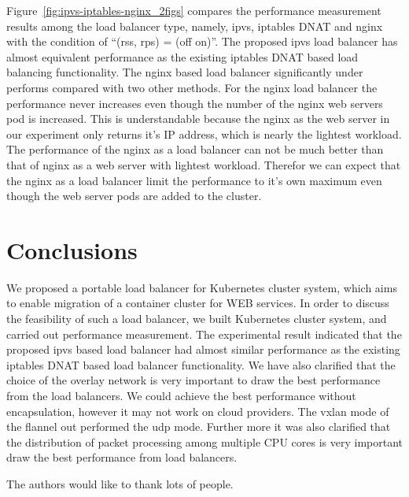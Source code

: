 Figure~\ref{fig:ipvs-iptables-nginx_2figs} compares the performance measurement results 
among the load balancer type, namely, ipvs, iptables DNAT and nginx 
with the condition of \enquote{(rss, rps) = (off on)}.
The proposed ipvs load balancer has almost equivalent performance as the existing iptables 
DNAT based load balancing functionality. 
The nginx based load balancer significantly under performs compared with two other methods.
For the nginx load balancer the performance never increases even though the number of the 
nginx web servers pod is increased.
This is understandable because the nginx as the web server in our experiment only 
returns it's IP address, which is nearly the lightest workload.
The performance of the nginx as a load balancer can not be much better than that of nginx as a web server 
with lightest workload.
Therefor we can expect that the nginx as a load balancer limit the performance to it's own maximum 
even though the web server pods are added to the cluster.

\section{Conclusions}\label{Conclusions}

We proposed a portable load balancer for Kubernetes cluster system, 
which aims to enable migration of a container cluster for WEB services.
In order to discuss the feasibility of such a load balancer, we built 
Kubernetes cluster system, and carried out performance measurement.
The experimental result indicated that the proposed ipvs based load balancer
had almost similar performance as the existing iptables DNAT based load balancer functionality.
We have also clarified that the choice of the overlay network is very important to draw 
the best performance from the load balancers.
We could achieve the best performance without encapsulation, however it may not work on cloud providers.
The vxlan mode of the flannel out performed the udp mode.
Further more it was also clarified that the distribution of packet processing among multiple CPU cores is very important
draw the best performance from load balancers.




\begin{acks}
  The authors would like to thank lots of people.

\end{acks}
